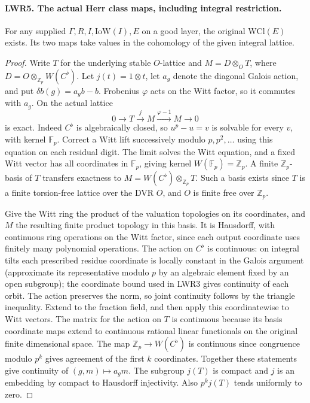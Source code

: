 \paragraph{LWR5. The actual Herr class maps, including integral restriction.}
\label{claim:LWR5}
For any supplied $\Gamma,R,I,\mathrm{IoW}(I),E$ on a good layer,
the original $\mathrm{WCl}(E)$ exists. Its two maps take values in
the cohomology of the given integral lattice.

\begin{proof}
Write $T$ for the underlying stable $O$-lattice and
$M=D\otimes_O T$, where $D=O\otimes_{\mathbb Z_p}W(C^\flat)$.
Let $j(t)=1\otimes t$, let $a_g$ denote the diagonal Galois action,
and put $\delta b(g)=a_g b-b$. Frobenius $\varphi$ acts on the
Witt factor, so it commutes with $a_g$. On the actual lattice
\[
  0\longrightarrow T\xrightarrow{j}M
     \xrightarrow{\varphi-1}M\longrightarrow0
\]
is exact. Indeed $C^\flat$ is algebraically closed, so $u^p-u=v$
is solvable for every $v$, with kernel $\mathbb F_p$. Correct a
Witt lift successively modulo $p,p^2,\ldots$ using this equation
on each residual digit. The limit solves the Witt equation, and a
fixed Witt vector has all coordinates in $\mathbb F_p$, giving
kernel $W(\mathbb F_p)=\mathbb Z_p$. A finite $\mathbb Z_p$-basis
of $T$ transfers exactness to $M=W(C^\flat)\otimes_{\mathbb Z_p}T$.
Such a basis exists since $T$ is a finite torsion-free lattice over
the DVR $O$, and $O$ is finite free over $\mathbb Z_p$.

Give the Witt ring the product of the valuation topologies on its
coordinates, and $M$ the resulting finite product topology in this
basis. It is Hausdorff, with continuous ring operations on the Witt
factor, since each output coordinate uses finitely many polynomial
operations. The action on $C^\flat$ is continuous: on integral
tilts each prescribed residue coordinate is locally constant in the
Galois argument (approximate its representative modulo $p$ by an
algebraic element fixed by an open subgroup); the coordinate bound
used in LWR3 gives continuity of each orbit. The action preserves
the norm, so joint continuity follows by the triangle inequality.
Extend to the fraction field, and then apply this coordinatewise
to Witt vectors. The matrix for the action on $T$ is continuous
because its basis coordinate maps extend to continuous rational
linear functionals on the original finite dimensional space.
The map $\mathbb Z_p\to W(C^\flat)$ is continuous since congruence
modulo $p^k$ gives agreement of the first $k$ coordinates.
Together these statements give continuity of $(g,m)\mapsto a_g m$.
The subgroup $j(T)$ is compact and $j$ is an embedding by compact
to Hausdorff injectivity. Also $p^k j(T)$ tends uniformly to zero.


\end{proof}
